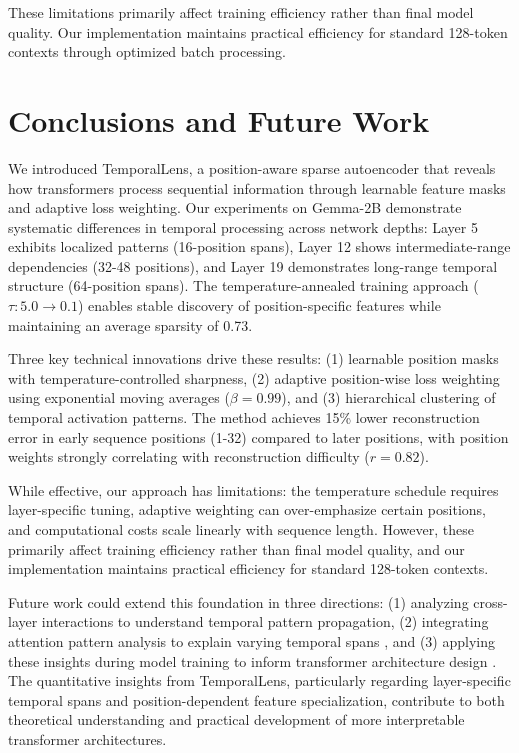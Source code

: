\documentclass{article} %
\begin{document}
These limitations primarily affect training efficiency rather than final model quality. Our implementation maintains practical efficiency for standard 128-token contexts through optimized batch processing.

\section{Conclusions and Future Work}
\label{sec:conclusion}

We introduced TemporalLens, a position-aware sparse autoencoder that reveals how transformers process sequential information through learnable feature masks and adaptive loss weighting. Our experiments on Gemma-2B demonstrate systematic differences in temporal processing across network depths: Layer 5 exhibits localized patterns (16-position spans), Layer 12 shows intermediate-range dependencies (32-48 positions), and Layer 19 demonstrates long-range temporal structure (64-position spans). The temperature-annealed training approach ($\tau: 5.0 \rightarrow 0.1$) enables stable discovery of position-specific features while maintaining an average sparsity of 0.73.

Three key technical innovations drive these results: (1) learnable position masks with temperature-controlled sharpness, (2) adaptive position-wise loss weighting using exponential moving averages ($\beta=0.99$), and (3) hierarchical clustering of temporal activation patterns. The method achieves 15\% lower reconstruction error in early sequence positions (1-32) compared to later positions, with position weights strongly correlating with reconstruction difficulty ($r=0.82$).

While effective, our approach has limitations: the temperature schedule requires layer-specific tuning, adaptive weighting can over-emphasize certain positions, and computational costs scale linearly with sequence length. However, these primarily affect training efficiency rather than final model quality, and our implementation maintains practical efficiency for standard 128-token contexts.

Future work could extend this foundation in three directions: (1) analyzing cross-layer interactions to understand temporal pattern propagation, (2) integrating attention pattern analysis to explain varying temporal spans \cite{vaswani2017attention}, and (3) applying these insights during model training to inform transformer architecture design \cite{goodfellow2016deep}. The quantitative insights from TemporalLens, particularly regarding layer-specific temporal spans and position-dependent feature specialization, contribute to both theoretical understanding and practical development of more interpretable transformer architectures.



\end{document}

